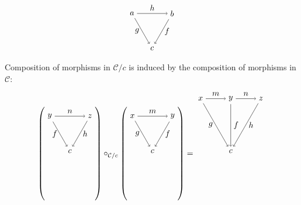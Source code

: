 \documentclass[12pt]{article}
\theoremstyle{definition}
\theoremstyle{remark}
\newcommand{\catC}{\mathcal{C}}
\begin{document}
\[
    \begin{tikzpicture}
        \draw (150:1) node(tl){$a$};
        \draw ( 30:1) node(tr){$b$};
        \draw (270:1)node(bm){$c$};

        \draw[->] (tl) to node[below,left ]{$g$} (bm);
        \draw[->] (tr) to node[below,right]{$f$} (bm);

        \draw[->] (tl) to node[above]{$h$} (tr);
    \end{tikzpicture}
\]
Composition of morphisms in $\catC/c$ is induced by the composition of morphisms in $\catC$:
\[
    \left(
    \begin{tikzpicture}
        \draw (150:1) node(tl){$y$};
        \draw ( 30:1) node(tr){$z$};
        \draw (270:1) node(bm){$c$};

        \draw[->] (tl) to node[below,left ]{$f$} (bm);
        \draw[->] (tr) to node[below,right]{$h$} (bm);

        \draw[->] (tl) to node[above]{$n$} (tr);
    \end{tikzpicture}
    \right)
    \circ_{\catC/c}
    \left(
    \begin{tikzpicture}
        \draw (150:1) node(tl){$x$};
        \draw ( 30:1) node(tr){$y$};
        \draw (270:1) node(bm){$c$};

        \draw[->] (tl) to node[below,left ]{$g$} (bm);
        \draw[->] (tr) to node[below,right]{$f$} (bm);

        \draw[->] (tl) to node[above]{$m$} (tr);
    \end{tikzpicture}
    \right)
    =
    \begin{tikzpicture}
        \draw (150:1.5) node(tl){$x$};
        \draw ( 90:0.75) node(tm){$y$};
        \draw ( 30:1.5) node(tr){$z$};
        \draw (270:1.5) node(bm){$c$};

        \draw[->] (tl) to node[below,left ]{$g$} (bm);
        \draw[->] (tm) to node[right]{$f$} (bm);
        \draw[->] (tr) to node[below,right]{$h$} (bm);

        \draw[->] (tl) to node[above]{$m$} (tm);
        \draw[->] (tm) to node[above]{$n$} (tr);
    \end{tikzpicture}
\]
\end{document}
